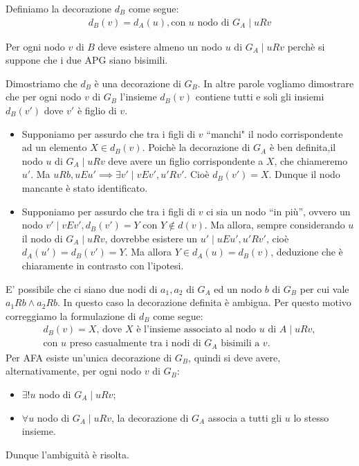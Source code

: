 \begin{proof2}
\begin{enumerate}
              Definiamo la decorazione $d_B$ come segue:
              \begin{gather*}
                  d_B(v) = d_A(u), \text{con $u$ nodo di $G_A$} \mid u R v
              \end{gather*}
              \begin{observation*}
                  Per ogni nodo $v$ di $B$ deve esistere almeno un nodo $u$ di $G_A \mid u R v$ perchè si suppone che i due APG siano bisimili.
              \end{observation*}
              Dimostriamo che $d_B$ è una decorazione di $G_B$. In altre parole vogliamo dimostrare che per ogni nodo $v$ di $G_B$ l'insieme $d_B(v)$ contiene tutti e soli gli insiemi $d_B(v')$ dove $v'$ è figlio di $v$.
              \begin{itemize}
                  \item Supponiamo per assurdo che tra i figli di $v$ ``manchi" il nodo corrispondente ad un elemento $X \in d_B(v)$. Poichè la decorazione di $G_A$ è ben definita,il nodo $u$ di $G_A \mid u R v$ deve avere un figlio corrispondente a $X$, che chiameremo $u'$. Ma $u R b, u E u' \implies \exists v' \mid v E v', u' R v'$. Cioè $d_B(v') = X$. Dunque il nodo mancante è stato identificato.
                  \item Supponiamo per assurdo che tra i figli di $v$ ci sia un nodo ``in più'', ovvero un nodo $v' \mid v E v', d_B(v') = Y$ con $Y \notin d(v)$. Ma allora, sempre considerando $u$ il nodo di $G_A \mid u R v$, dovrebbe esistere un $u' \mid u E u', u' R v'$, cioè $d_A(u') = d_B(v') = Y$.
                  Ma allora $Y \in d_A(u) = d_B(v)$, deduzione che è chiaramente in contrasto con l'ipotesi.
              \end{itemize}
              E' possibile che ci siano due nodi di $a_1, a_2$ di $G_A$ ed un nodo $b$ di $G_B$ per cui vale $a_1 R b \land a_2 R b$. In questo caso la decorazione definita è ambigua. Per questo motivo correggiamo la formulazione di $d_B$ come segue:
              \begin{gather*}
                d_B(v) = X \text{, dove $X$ è l'insieme associato al nodo $u$ di $A$} \mid u R v, \\
                \text{con $u$ preso casualmente tra i nodi di $G_A$ bisimili a $v$.}
              \end{gather*}
              Per AFA esiste un'unica decorazione di $G_B$, quindi si deve avere, alternativamente, per ogni nodo $v$ di $G_B$:
              \begin{itemize}
                  \item $\exists ! u$ nodo di $G_A \mid u R v$;
                  \item $\forall u$ nodo di $G_A \mid u R v$, la decorazione di $G_A$ associa a tutti gli $u$ lo stesso insieme.
              \end{itemize}
              Dunque l'ambiguità è risolta.
    \end{enumerate}
    \vspace*{-0.75cm}
\end{proof2}
